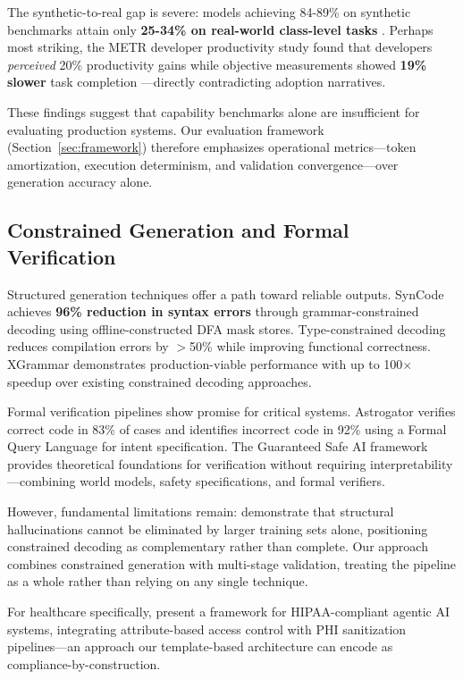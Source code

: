 \documentclass[11pt]{article}
\begin{document}
The synthetic-to-real gap is severe: models achieving 84-89\% on synthetic benchmarks attain only \textbf{25-34\% on real-world class-level tasks} \citep{rao2025synthetic}. Perhaps most striking, the METR developer productivity study found that developers \emph{perceived} 20\% productivity gains while objective measurements showed \textbf{19\% slower} task completion \citep{metr2025productivity}—directly contradicting adoption narratives.

These findings suggest that capability benchmarks alone are insufficient for evaluating production systems. Our evaluation framework (Section~\ref{sec:framework}) therefore emphasizes operational metrics—token amortization, execution determinism, and validation convergence—over generation accuracy alone.

\subsection{Constrained Generation and Formal Verification}

Structured generation techniques offer a path toward reliable outputs. SynCode \citep{ugare2024syncode} achieves \textbf{96\% reduction in syntax errors} through grammar-constrained decoding using offline-constructed DFA mask stores. Type-constrained decoding \citep{mundler2025typeconstrained} reduces compilation errors by $>$50\% while improving functional correctness. XGrammar \citep{dong2024xgrammar} demonstrates production-viable performance with up to 100$\times$ speedup over existing constrained decoding approaches.

Formal verification pipelines show promise for critical systems. Astrogator \citep{councilman2025astrogator} verifies correct code in 83\% of cases and identifies incorrect code in 92\% using a Formal Query Language for intent specification. The Guaranteed Safe AI framework \citep{dalrymple2024guaranteed} provides theoretical foundations for verification without requiring interpretability—combining world models, safety specifications, and formal verifiers.

However, fundamental limitations remain: \citet{xu2024hallucination} demonstrate that structural hallucinations cannot be eliminated by larger training sets alone, positioning constrained decoding as complementary rather than complete. Our approach combines constrained generation with multi-stage validation, treating the pipeline as a whole rather than relying on any single technique.

For healthcare specifically, \citet{neupane2025hipaa} present a framework for HIPAA-compliant agentic AI systems, integrating attribute-based access control with PHI sanitization pipelines—an approach our template-based architecture can encode as compliance-by-construction.
\end{document}
